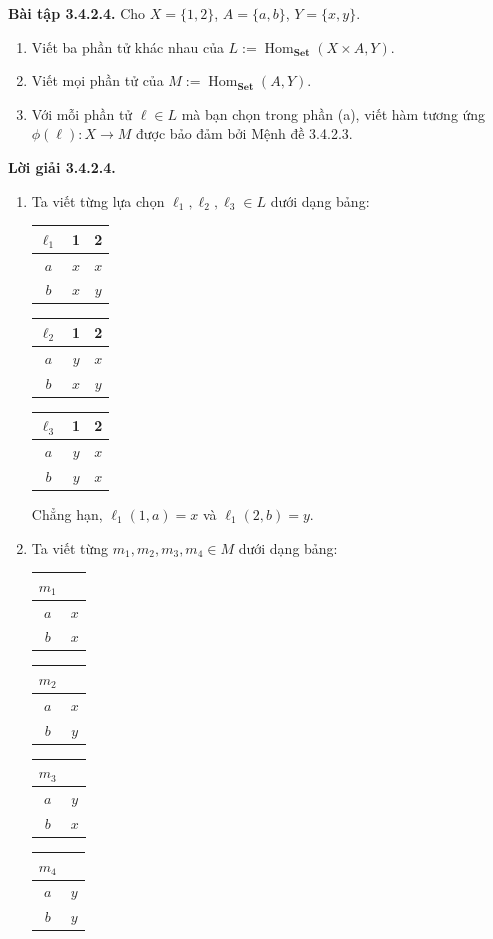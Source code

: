 \noindent\textbf{Bài tập 3.4.2.4.} Cho $X=\{1,2\}$, $A=\{a,b\}$, $Y=\{x,y\}$.
\begin{enumerate}[label=\alph*.]
\item Viết ba phần tử khác nhau của $L:=\operatorname{Hom}_{\mathbf{Set}}(X\times A,Y)$.
\item Viết mọi phần tử của $M:=\operatorname{Hom}_{\mathbf{Set}}(A,Y)$.
\item Với mỗi phần tử $\ell\in L$ mà bạn chọn trong phần (a), viết hàm tương ứng $\phi(\ell):X\to M$ được bảo đảm bởi Mệnh đề 3.4.2.3.
\end{enumerate}
\noindent\textbf{Lời giải 3.4.2.4.}\keepwithnext
\begin{enumerate}[label=\alph*.]
\item Ta viết từng lựa chọn $\ell_1,\ell_2,\ell_3\in L$ dưới dạng bảng:
\begin{center}\begin{tabular}{c|cc}$\ell_1$&1&2\\\hline$a$&$x$&$x$\\$b$&$x$&$y$\end{tabular}\qquad\begin{tabular}{c|cc}$\ell_2$&1&2\\\hline$a$&$y$&$x$\\$b$&$x$&$y$\end{tabular}\qquad\begin{tabular}{c|cc}$\ell_3$&1&2\\\hline$a$&$y$&$x$\\$b$&$y$&$x$\end{tabular}\end{center}
Chẳng hạn, $\ell_1(1,a)=x$ và $\ell_1(2,b)=y$.
\item Ta viết từng $m_1,m_2,m_3,m_4\in M$ dưới dạng bảng:
\begin{center}\begin{tabular}{c|c}$m_1$&\\\hline$a$&$x$\\$b$&$x$\end{tabular}\qquad\begin{tabular}{c|c}$m_2$&\\\hline$a$&$x$\\$b$&$y$\end{tabular}\qquad\begin{tabular}{c|c}$m_3$&\\\hline$a$&$y$\\$b$&$x$\end{tabular}\qquad\begin{tabular}{c|c}$m_4$&\\\hline$a$&$y$\\$b$&$y$\end{tabular}\end{center}

\end{enumerate}
